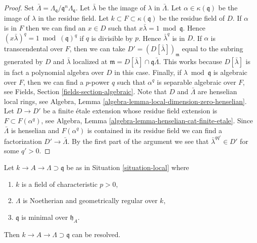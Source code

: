\begin{proof}
Set $\bar \Lambda = \Lambda_\mathfrak q/\mathfrak q^n\Lambda_\mathfrak q$.
Let $\bar \lambda$ be the image of $\lambda$ in $\bar \Lambda$.
Let $\alpha \in \kappa(\mathfrak q)$ be the image of $\lambda$ in the
residue field.
Let $k \subset F \subset \kappa(\mathfrak q)$ be the residue field of $D$.
If $\alpha$ is in $F$ then we can find an
$x \in D$ such that $x \bar\lambda = 1 \bmod \mathfrak q$. Hence
$(x \bar \lambda)^q = 1 \bmod (\mathfrak q)^q$ if $q$ is divisible by $p$.
Hence $\bar\lambda^q$ is in $D$. If $\alpha$ is
transcendental over $F$, then we can take $D' = (D[\bar \lambda])_\mathfrak m$
equal to the subring generated by $D$ and $\bar \lambda$ localized
at $\mathfrak m = D[\bar \lambda] \cap \mathfrak q \bar \Lambda$.
This works because $D[\bar \lambda]$ is in fact a polynomial algebra
over $D$ in this case. Finally, if $\lambda \bmod \mathfrak q$ is
algebraic over $F$, then we can find a $p$-power $q$ such that
$\alpha^q$ is separable algebraic over $F$, see
Fields, Section \ref{fields-section-algebraic}.
Note that $D$ and $\bar\Lambda$ are henselian local rings, see
Algebra, Lemma \ref{algebra-lemma-local-dimension-zero-henselian}.
Let $D \to D'$ be a finite \'etale extension
whose residue field extension is $F \subset F(\alpha^q)$, see
Algebra, Lemma \ref{algebra-lemma-henselian-cat-finite-etale}.
Since $\bar\Lambda$ is henselian and $F(\alpha^q)$ is contained
in its residue field we can find a factorization
$D' \to \bar \Lambda$. By the first part of the argument
we see that $\bar\lambda^{qq'} \in D'$ for some $q' > 0$.
\end{proof}

\begin{lemma}
\label{lemma-resolve-general}
Let $k \to A \to \Lambda \supset \mathfrak q$ be as in
Situation \ref{situation-local} where
\begin{enumerate}
\item $k$ is a field of characteristic $p > 0$,
\item $\Lambda$ is Noetherian and geometrically regular over $k$,
\item $\mathfrak q$ is minimal over $\mathfrak h_A$.
\end{enumerate}
Then $k \to A \to \Lambda \supset \mathfrak q$ can be resolved.
\end{lemma}

